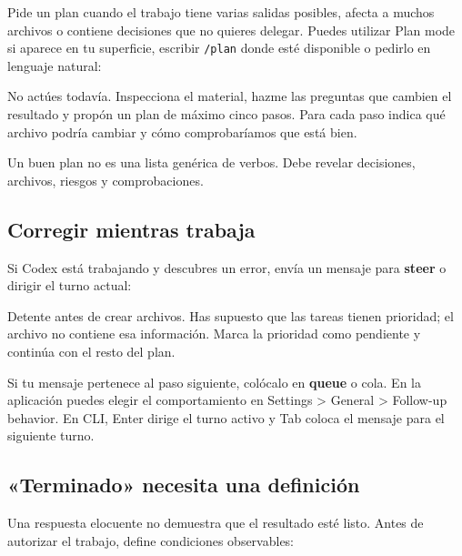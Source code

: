 \documentclass[10pt,a4paper,openany]{book}
\newenvironment{Shaded}{}{}
\newcommand{\NormalTok}[1]{#1}
\renewenvironment{Shaded}
  {\begin{tcolorbox}[
    enhanced,
    breakable,
    colback=CodeBg,
    colframe=Border,
    boxrule=0.5pt,
    arc=2mm,
    left=3mm,
    right=3mm,
    top=2.2mm,
    bottom=2.2mm,
    before skip=0.8em,
    after skip=0.9em
  ]}
  {\end{tcolorbox}}
\begin{document}
Pide un plan cuando el trabajo tiene varias salidas posibles, afecta a
muchos archivos o contiene decisiones que no quieres delegar. Puedes
utilizar Plan mode si aparece en tu superficie, escribir \texttt{/plan}
donde esté disponible o pedirlo en lenguaje natural:

\begin{Shaded}
\begin{Highlighting}[]
\NormalTok{No actúes todavía. Inspecciona el material, hazme las preguntas que cambien el}
\NormalTok{resultado y propón un plan de máximo cinco pasos. Para cada paso indica qué}
\NormalTok{archivo podría cambiar y cómo comprobaríamos que está bien.}
\end{Highlighting}
\end{Shaded}

Un buen plan no es una lista genérica de verbos. Debe revelar
decisiones, archivos, riesgos y comprobaciones.

\subsection{Corregir mientras trabaja}\label{corregir-mientras-trabaja}

Si Codex está trabajando y descubres un error, envía un mensaje para
\textbf{steer} o dirigir el turno actual:

\begin{Shaded}
\begin{Highlighting}[]
\NormalTok{Detente antes de crear archivos. Has supuesto que las tareas tienen prioridad;}
\NormalTok{el archivo no contiene esa información. Marca la prioridad como pendiente y}
\NormalTok{continúa con el resto del plan.}
\end{Highlighting}
\end{Shaded}

Si tu mensaje pertenece al paso siguiente, colócalo en \textbf{queue} o
cola. En la aplicación puedes elegir el comportamiento en Settings
\textgreater{} General \textgreater{} Follow-up behavior. En CLI, Enter
dirige el turno activo y Tab coloca el mensaje para el siguiente turno.

\subsection{«Terminado» necesita una
definición}\label{terminado-necesita-una-definiciuxf3n}

Una respuesta elocuente no demuestra que el resultado esté listo. Antes
de autorizar el trabajo, define condiciones observables:
\end{document}
